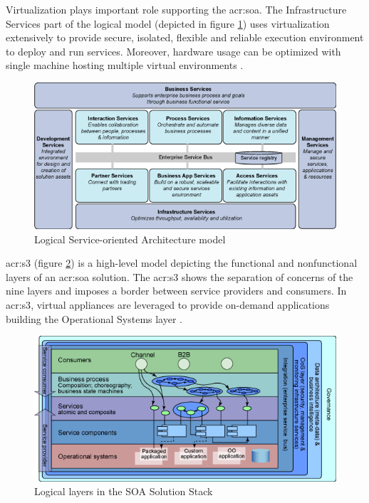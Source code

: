 \documentclass[11pt]{book}
\begin{document}
        Virtualization plays important role supporting the \gls{acr:soa}. The Infrastructure Services part of the
        logical model (depicted in figure \ref{fig:ctx:soa-logical}) uses virtualization extensively to provide secure,
        isolated, flexible and reliable execution environment to deploy and run services. Moreover, hardware usage can
        be optimized with single machine hosting multiple virtual environments \cite{soa-foundation}.

        \begin{figure}[H]
          \begin{center}
            \includegraphics[scale=.5]{img/ctx/soa-logical.png}
          \end{center}

          \caption{Logical Service-oriented Architecture model}
          \label{fig:ctx:soa-logical}
        \end{figure}

        \gls{acr:s3} (figure \ref{fig:ctx:soa-stack}) is a high-level model depicting the functional and nonfunctional
        layers of an \gls{acr:soa} solution.  The \gls{acr:s3} shows the separation of concerns of the nine layers and
        imposes a border between service providers and consumers. In \gls{acr:s3}, virtual appliances are leveraged to
        provide on-demand applications building the Operational Systems layer \cite{soa-stack}.

        \begin{figure}[H]
          \begin{center}
            \includegraphics[scale=.5]{img/ctx/soa-stack.png}
          \end{center}

          \caption{Logical layers in the SOA Solution Stack}
          \label{fig:ctx:soa-stack}
        \end{figure}
\end{document}
